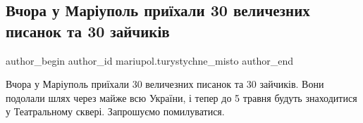  
 
 
 
 

\subsection{Вчора у Маріуполь приїхали 30 величезних писанок та 30 зайчиків}
\label{sec:26_04_2019.fb.mariupol.turystychne_misto.1.arrival_pysanky_zajchiki}

\ifcmt
 author_begin
   author_id mariupol.turystychne_misto
 author_end
\fi

Вчора у Маріуполь приїхали 30 величезних писанок та 30 зайчиків. Вони подолали
шлях через майже всю України, і тепер до 5 травня будуть знаходитися у
Театральному сквері. Запрошуємо помилуватися.

